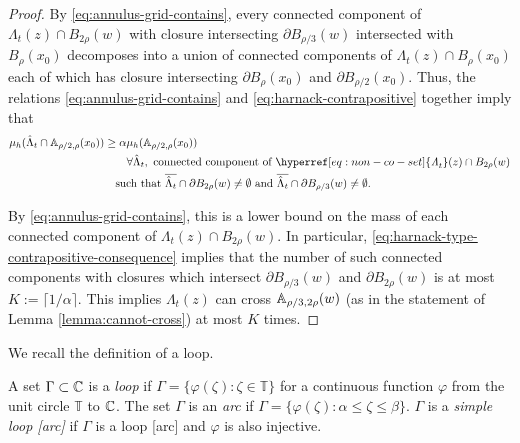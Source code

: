 \documentclass[12pt]{amsart}
\numberwithin{equation}{section}
\newcommand{\cluster}[2]{\hyperref[eq:non-co-set]{\mathit{\Lambda}^{#1}_{#2}}}
\begin{document}
\begin{proof}
		By \eqref{eq:annulus-grid-contains}, every connected component of ${\cluster{}{t}(z)} \cap B_{2 \rho}(w)$
		with closure intersecting $\partial B_{\rho/3}(w)$ 
		intersected with $B_{\rho}(x_0)$ decomposes into a union of connected components of 
		${\cluster{}{t}(z)} \cap B_{\rho}(x_0)$ each of which has closure intersecting $\partial B_{\rho}(x_0)$ and $\partial B_{\rho/2}(x_0)$. 
		Thus, the relations \eqref{eq:annulus-grid-contains} and \eqref{eq:harnack-contrapositive} together imply that
		\begin{equation} \label{eq:harnack-type-contrapositive-consequence}
		\begin{aligned}
		\mu_h(\hat \Lambda_t \cap \A_{\rho/2, \rho}(x_0)) &\geq \alpha \mu_h(\A_{\rho/2, \rho}(x_0)) \\
		&\qquad \forall \hat \Lambda_t, \mbox{ connected component of ${\cluster{}{t}(z)} \cap B_{2 \rho}(w)$} \\
		&\quad \mbox{such that $\overline{\hat \Lambda_t} \cap \partial B_{2 \rho}(w) \neq \emptyset$ and $\overline{\hat \Lambda_t} \cap \partial B_{\rho/3}(w) \neq \emptyset$}.
		\end{aligned}
		\end{equation}
		
		By \eqref{eq:annulus-grid-contains}, this is a lower bound on the mass of each connected component of ${\cluster{}{t}(z)} \cap B_{2 \rho}(w)$. 
		In particular, \eqref{eq:harnack-type-contrapositive-consequence} implies that the number of such connected components with closures which intersect
		$\partial B_{\rho/3}(w)$ and $\partial B_{2 \rho}(w)$ is at most $K := \lceil 1/\alpha \rceil$. 
		This implies ${\cluster{}{t}(z)}$ can cross $\mathbb{A}_{\rho/3, 2 \rho}(w)$ (as in the statement of Lemma \ref{lemma:cannot-cross}) at most $K$ times. 
	\end{proof}
	
	
	
	
	We recall the definition of a loop.
	\begin{definition}
		A set $\Gamma \subset \mathbb{C}$ is a \emph{loop} if $\Gamma = \{\varphi(\zeta): \zeta \in \mathbb T\}$
		for a continuous function $\varphi$ from the unit circle $\mathbb T$ to $\mathbb{C}$. The set $\Gamma$ is an \emph{arc} if $\Gamma = \{\varphi(\zeta): \alpha \leq \zeta \leq \beta\}$.
		$\Gamma$ is a \emph{simple loop [arc]} if $\Gamma$ is a loop [arc] and $\varphi$ is also injective. 
		
	\end{definition}
	
	
	
\end{document}
